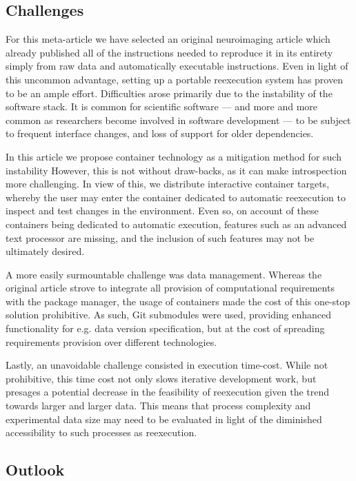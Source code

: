 \subsection{Challenges}
For this meta-article we have selected an original neuroimaging article which already published all of the instructions needed to reproduce it in its entirety simply from raw data and automatically executable instructions.
Even in light of this uncommon advantage, setting up a portable reexecution system has proven to be an ample effort.
Difficulties arose primarily due to the instability of the software stack.
It is common for scientific software — and more and more common as researchers become involved in software development — to be subject to frequent interface changes, and loss of support for older dependencies.

In this article we propose container technology as a mitigation method for such instability
However, this is not without draw-backs, as it can make introspection more challenging.
In view of this, we distribute interactive container targets, whereby the user may enter the container dedicated to automatic reexecution to inspect and test changes in the environment.
Even so, on account of these containers being dedicated to automatic execution, features such as an advanced text processor are missing, and the inclusion of such features may not be ultimately desired.

A more easily surmountable challenge was data management.
Whereas the original article strove to integrate all provision of computational requirements with the package manager, the usage of containers made the cost of this one-stop solution prohibitive.
As such, Git submodules were used, providing enhanced functionality for e.g. data version specification, but at the cost of spreading requirements provision over different technologies.

Lastly, an unavoidable challenge consisted in execution time-cost.
While not prohibitive, this time cost not only slows iterative development work, but presages a potential decrease in the feasibility of reexecution given the trend towards larger and larger data.
This means that process complexity and experimental data size may need to be evaluated in light of the diminished accessibility to such processes as reexecution.

\subsection{Outlook}

